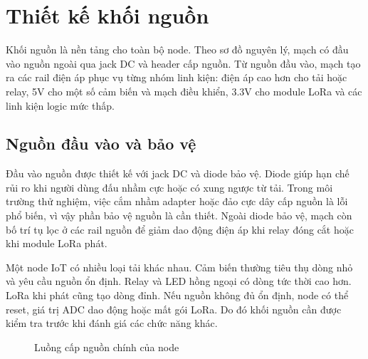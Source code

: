 \section{Thiết kế khối nguồn}
Khối nguồn là nền tảng cho toàn bộ node. Theo sơ đồ nguyên lý, mạch có đầu vào nguồn ngoài qua jack DC và header cấp nguồn. Từ nguồn đầu vào, mạch tạo ra các rail điện áp phục vụ từng nhóm linh kiện: điện áp cao hơn cho tải hoặc relay, 5V cho một số cảm biến và mạch điều khiển, 3.3V cho module LoRa và các linh kiện logic mức thấp.

\subsection{Nguồn đầu vào và bảo vệ}
Đầu vào nguồn được thiết kế với jack DC và diode bảo vệ. Diode giúp hạn chế rủi ro khi người dùng đấu nhầm cực hoặc có xung ngược từ tải. Trong môi trường thử nghiệm, việc cắm nhầm adapter hoặc đảo cực dây cấp nguồn là lỗi phổ biến, vì vậy phần bảo vệ nguồn là cần thiết. Ngoài diode bảo vệ, mạch còn bố trí tụ lọc ở các rail nguồn để giảm dao động điện áp khi relay đóng cắt hoặc khi module LoRa phát.

Một node IoT có nhiều loại tải khác nhau. Cảm biến thường tiêu thụ dòng nhỏ và yêu cầu nguồn ổn định. Relay và LED hồng ngoại có dòng tức thời cao hơn. LoRa khi phát cũng tạo dòng đỉnh. Nếu nguồn không đủ ổn định, node có thể reset, giá trị ADC dao động hoặc mất gói LoRa. Do đó khối nguồn cần được kiểm tra trước khi đánh giá các chức năng khác.

\begin{figure}[h!]
    \centering
    \caption{Luồng cấp nguồn chính của node}
    \label{fig:power_flow}
\end{figure}

